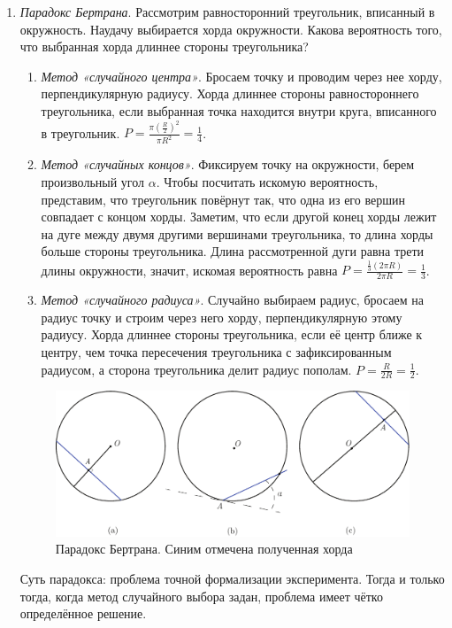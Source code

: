         \begin{enumerate}
            \item \emph{Парадокс Бертрана}. Рассмотрим равносторонний треугольник, вписанный в окружность. Наудачу выбирается хорда окружности. Какова вероятность того, что выбранная хорда длиннее стороны треугольника?
            \begin{enumerate}
                \item \emph{Метод «случайного центра»}. Бросаем точку и проводим через нее хорду, перпендикулярную радиусу. Хорда длиннее стороны равностороннего треугольника, если выбранная точка находится внутри круга, вписанного в треугольник. $P = \frac{\pi{(\frac{R}{2})}^2}{\pi R^2} = \frac{1}{4}$.
                \item \emph{Метод «случайных концов»}. Фиксируем точку на окружности, берем произвольный угол $\alpha$. Чтобы посчитать искомую вероятность, представим, что треугольник повёрнут так, что одна из его вершин совпадает с концом хорды. Заметим, что если другой конец хорды лежит на дуге между двумя другими вершинами треугольника, то длина хорды больше стороны треугольника. Длина рассмотренной дуги равна трети длины окружности, значит, искомая вероятность равна $P = \frac{\frac{1}{3}(2 \pi R)}{2 \pi R} = \frac{1}{3}$.
                \item \emph{Метод «случайного радиуса»}. Случайно выбираем радиус, бросаем на радиус точку и строим через него хорду, перпендикулярную этому радиусу. Хорда длиннее стороны треугольника, если её центр ближе к центру, чем точка пересечения треугольника с зафиксированным радиусом, а сторона треугольника делит радиус пополам. $P = \frac{R}{2R} = \frac{1}{2}$.
            \end{enumerate}
            \begin{figure}[h!]
				\centering
				\includegraphics[width=0.6\linewidth]{Lect02/bertrand.pdf}
				\caption{Парадокс Бертрана. Синим отмечена полученная хорда}
				\label{lect02:pic2}
			\end{figure}
            Суть парадокса: проблема точной формализации эксперимента. Тогда и только тогда, когда метод случайного выбора задан, проблема имеет чётко определённое решение.

\end{enumerate}
